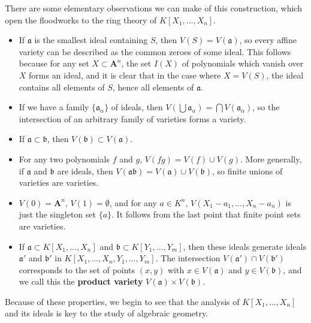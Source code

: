 There are some elementary observations we can make of this construction, which open the floodworks to the ring theory of $K[X_1, \dots, X_n]$.
%
\begin{itemize}
    \item If $\mathfrak{a}$ is the smallest ideal containing $S$, then $V(S) = V(\mathfrak{a})$, so every affine variety can be described as the common zeroes of some ideal. This follows because for any set $X \subset \mathbf{A}^n$, the set $I(X)$ of polynomials which vanish over $X$ forms an ideal, and it is clear that in the case where $X = V(S)$, the ideal contains all elements of $S$, hence all elements of $\mathfrak{a}$.

    \item If we have a family $\{ \mathfrak{a}_\alpha \}$ of ideals, then $V(\bigcup \mathfrak{a}_\alpha) = \bigcap V(\mathfrak{a}_\alpha)$, so the intersection of an arbitrary family of varieties forms a variety.

    \item If $\mathfrak{a} \subset \mathfrak{b}$, then $V(\mathfrak{b}) \subset V(\mathfrak{a})$.

    \item For any two polynomials $f$ and $g$, $V(fg) = V(f) \cup V(g)$. More generally, if $\mathfrak{a}$ and $\mathfrak{b}$ are ideals, then $V(\mathfrak{a}\mathfrak{b}) = V(\mathfrak{a}) \cup V(\mathfrak{b})$, so finite unions of varieties are varieties.

    \item $V(0) = \mathbf{A}^n$, $V(1) = \emptyset$, and for any $a \in K^n$, $V(X_1-a_1,\dots,X_n - a_n)$ is just the singleton set $\{ a \}$. It follows from the last point that finite point sets are varieties.

    \item If $\mathfrak{a} \subset K[X_1, \dots, X_n]$ and $\mathfrak{b} \subset K[Y_1, \dots, Y_m]$, then these ideals generate ideals $\mathfrak{a}'$ and $\mathfrak{b}'$ in $K[X_1, \dots, X_n, Y_1, \dots, Y_m]$. The intersection $V(\mathfrak{a}') \cap V(\mathfrak{b}')$ corresponds to the set of points $(x,y)$ with $x \in V(\mathfrak{a})$ and $y \in V(\mathfrak{b})$, and we call this the {\bf product variety} $V(\mathfrak{a}) \times V(\mathfrak{b})$.
\end{itemize}
%
Because of these properties, we begin to see that the analysis of $K[X_1, \dots, X_n]$ and its ideals is key to the study of algebraic geometry.

